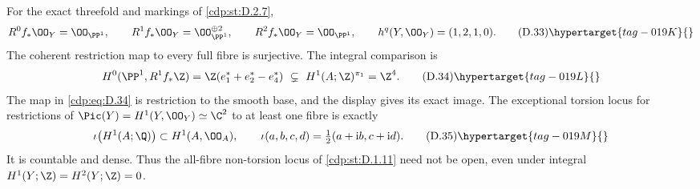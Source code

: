 \begin{proposition}\hypertarget{tag-01GF}{}\label{cdp:st:D.2.8}


For the exact threefold and markings of \ref{cdp:st:D.2.7},
\[
 R^0f_*\OO_Y=\OO_{\PP^1},\qquad
 R^1f_*\OO_Y=\OO_{\PP^1}^{\oplus2},\qquad
 R^2f_*\OO_Y=\OO_{\PP^1},
 \qquad h^q(Y,\OO_Y)=(1,2,1,0).
\tag{D.33}\hypertarget{tag-019K}{}\label{cdp:eq:D.33}
\]
The coherent restriction map to every full fibre is surjective.
The integral comparison is
\[
 H^0(\PP^1,R^1f_*\Z)
   =\Z(e_1^*+e_2^*-e_4^*)
   \ \subsetneq\ H^1(A;\Z)^{\pi_1}=\Z^4.
\tag{D.34}\hypertarget{tag-019L}{}\label{cdp:eq:D.34}
\]
The map in \eqref{cdp:eq:D.34} is restriction to the smooth base, and the
display gives its exact image. The exceptional torsion locus
for restrictions of $\Pic(Y)=H^1(Y,\OO_Y)\simeq\C^2$ to
at least one fibre is exactly
\[
 \iota\bigl(H^1(A;\Q)\bigr)\subset H^1(A,\OO_A),
 \qquad
 \iota(a,b,c,d)=\tfrac12(a+\mathrm i b,c+\mathrm i d).
\tag{D.35}\hypertarget{tag-019M}{}\label{cdp:eq:D.35}
\]
It is countable and dense. Thus the all-fibre non-torsion locus
of \ref{cdp:st:D.1.11} need not be open, even under integral
$H^1(Y;\Z)=H^2(Y;\Z)=0$.
\end{proposition}


